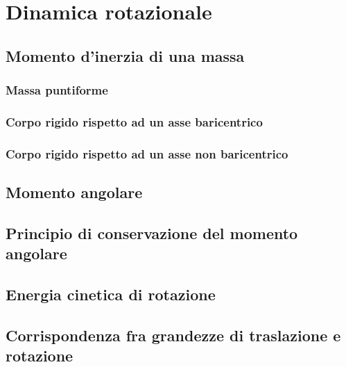 \section{Dinamica rotazionale}
\subsection{Momento d'inerzia di una massa}
\subsubsection{Massa puntiforme}
\subsubsection{Corpo rigido rispetto ad un asse baricentrico}
\subsubsection{Corpo rigido rispetto ad un asse non baricentrico}
\subsection{Momento angolare}
\subsection{Principio di conservazione del momento angolare}
\subsection{Energia cinetica di rotazione}
\subsection{Corrispondenza fra grandezze di traslazione e rotazione}